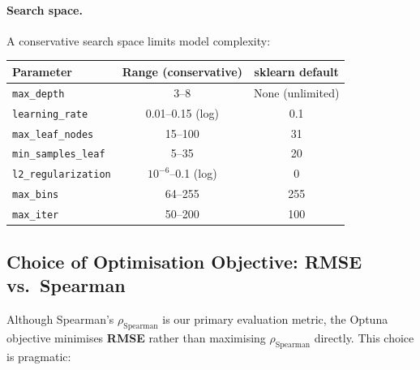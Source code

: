 \documentclass[11pt,a4paper]{article}
\newcommand{\rhoS}{\rho_{\text{Spearman}}}
\begin{document}
\paragraph{Search space.}
A conservative search space limits model complexity:

\begin{center}
      \small
      \begin{tabular}{lcc}
            \toprule
            Parameter                   & Range (conservative) & sklearn default  \\
            \midrule
            \texttt{max\_depth}         & 3--8                 & None (unlimited) \\
            \texttt{learning\_rate}     & 0.01--0.15 (log)     & 0.1              \\
            \texttt{max\_leaf\_nodes}   & 15--100              & 31               \\
            \texttt{min\_samples\_leaf} & 5--35                & 20               \\
            \texttt{l2\_regularization} & $10^{-6}$--0.1 (log) & 0                \\
            \texttt{max\_bins}          & 64--255              & 255              \\
            \texttt{max\_iter}          & 50--200              & 100              \\
            \bottomrule
      \end{tabular}
\end{center}

\subsection{Choice of Optimisation Objective: RMSE vs.\ Spearman}
\label{sec:objective}

Although Spearman's $\rhoS$ is our primary evaluation metric, the Optuna
objective minimises \textbf{RMSE} rather than maximising $\rhoS$ directly.
This choice is pragmatic:
\end{document}
